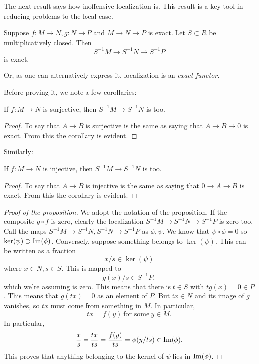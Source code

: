 The next result says how inoffensive localization is. This result is a key
tool in reducing problems to the local case.
\begin{proposition}
Suppose $f: M \to N, g: N \to P$ and  $M \to N \to P$ is exact. Let $S \subset
R$ be multiplicatively closed. Then
\[ S^{-1}M \to S^{-1}N \to S^{-1}P  \]
is exact.
\end{proposition}

Or, as one can alternatively express it, localization is an \emph{exact
functor.}

Before proving it, we note a few corollaries:
\begin{corollary}
If $f: M \to N$ is surjective, then $S^{-1}M \to S^{-1}N$ is too.
\end{corollary}
\begin{proof}
To say that $A \to B$ is surjective is the same as saying that $A \to B \to 0$
is exact. From this the corollary is evident.
\end{proof}

Similarly:
\begin{corollary}
If $f: M \to N$ is injective, then  $S^{-1}M \to S^{-1}N$ is too.
\end{corollary}
\begin{proof}
To say that $A \to B$ is injective is the same as saying that $0 \to A \to B $
is exact. From this the corollary is evident.
\end{proof}

\begin{proof}[Proof of the proposition] We adopt the notation of the
proposition.
If the composite $g\circ f$ is zero, clearly the localization $S^{-1}M \to
S^{-1}N \to S^{-1}P$ is zero too.
Call the maps $S^{-1}M \to S^{-1}N, S^{-1}N \to S^{-1}P$ as $\phi, \psi$. We
know that $\psi \circ \phi  = 0$ so $\ker(\psi) \supset \operatorname{Im}(\phi)$. Conversely,
suppose  something belongs to $\ker(\psi).  $ This can be written as a fraction
\[ x/s \in \ker(\psi)  \]
where $x \in N, s \in S$. This is mapped to
\[ g(x)/s \in S^{-1}P,  \]
which we're assuming is zero. This means that there is $t \in S$ with $tg(x) =
0 \in P$.  This means that $g(tx)=0$ as an element of $P$.  But $tx \in N$ and
its image of $g$ vanishes, so $tx$ must come from something in $M$.  In
particular,
\[ tx = f(y) \ \text{for some} \ y \in M.  \]
In particular,
\[ \frac{x}{s}  = \frac{tx}{ts} = \frac{f(y)}{ts} = \phi( y/ts) \in \operatorname{Im}(\phi).
\]
This proves that anything belonging to the kernel of $\psi$ lies in
$\operatorname{Im}(\phi)$.
\end{proof}

